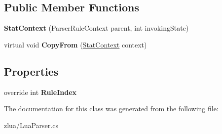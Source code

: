 \subsection*{Public Member Functions}
\begin{DoxyCompactItemize}
\item 
\mbox{\label{classzlua_1_1_lua_parser_1_1_stat_context_a7f2d56ec40304959f5d990feaf757646}} 
{\bfseries Stat\+Context} (Parser\+Rule\+Context parent, int invoking\+State)
\item 
\mbox{\label{classzlua_1_1_lua_parser_1_1_stat_context_ab58113833a6b2eef9b022a274da9628a}} 
virtual void {\bfseries Copy\+From} (\mbox{\hyperlink{classzlua_1_1_lua_parser_1_1_stat_context}{Stat\+Context}} context)
\end{DoxyCompactItemize}
\subsection*{Properties}
\begin{DoxyCompactItemize}
\item 
\mbox{\label{classzlua_1_1_lua_parser_1_1_stat_context_a754daf5ad5fb27ed6e74678e5eff94e8}} 
override int {\bfseries Rule\+Index}
\end{DoxyCompactItemize}


The documentation for this class was generated from the following file\+:\begin{DoxyCompactItemize}
\item 
zlua/Lua\+Parser.\+cs\end{DoxyCompactItemize}
